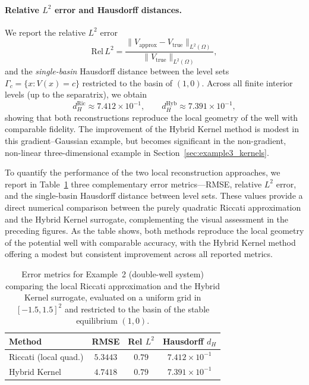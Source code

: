 \documentclass[11pt]{article}
\theoremstyle{plain}      %
\theoremstyle{definition} %
\begin{document}
\paragraph{Relative $L^2$ error and Hausdorff distances.}
We report the relative $L^2$ error
\[
\mathrm{Rel}\,L^2
=
\frac{\|V_{\mathrm{approx}} - V_{\mathrm{true}}\|_{L^2(\Omega)}}
     {\|V_{\mathrm{true}}\|_{L^2(\Omega)}},
\]
and the \emph{single-basin} Hausdorff distance between the level sets
$\Gamma_c = \{x : V(x)=c\}$ restricted to the basin of $(1,0)$.  
Across all finite interior levels (up to the separatrix), we obtain
\[
d_H^{\mathrm{Ric}} \approx 7.412\times10^{-1},
\qquad
d_H^{\mathrm{Hyb}} \approx 7.391\times10^{-1},
\]
showing that both reconstructions reproduce the local geometry of the well with
comparable fidelity. The improvement of the Hybrid Kernel method is modest in
this gradient–Gaussian example, but becomes significant in the non-gradient,
non-linear three-dimensional example in Section~\ref{sec:example3_kernels}.

To quantify the performance of the two local reconstruction approaches, we report in
Table~\ref{tab:example2_errors} three complementary error metrics—RMSE, relative
$L^{2}$ error, and the single-basin Hausdorff distance between level sets. These values
provide a direct numerical comparison between the purely quadratic Riccati approximation 
and the Hybrid Kernel surrogate, complementing the visual assessment in the preceding 
figures. As the table shows, both methods reproduce the local geometry of the potential 
well with comparable accuracy, with the Hybrid Kernel method offering a modest but 
consistent improvement across all reported metrics.

\begin{table}[h!]
    \centering
    \caption{Error metrics for Example~2 (double-well system) comparing the
    local Riccati approximation and the Hybrid Kernel surrogate, evaluated on a
    uniform grid in $[-1.5,1.5]^2$ and restricted to the basin of the stable
    equilibrium $(1,0)$.}
    \label{tab:example2_errors}
    \vspace{0.3em}
    \begin{tabular}{lccc}
        \toprule
        Method & RMSE & Rel $L^2$ & Hausdorff $d_H$ \\
        \midrule
        Riccati (local quad.)  & $5.3443$ & $0.79$ & $7.412\times 10^{-1}$ \\
        Hybrid Kernel          & $4.7418$ & $0.79$ & $7.391\times 10^{-1}$ \\
        \bottomrule
    \end{tabular}
\end{table}
\end{document}
